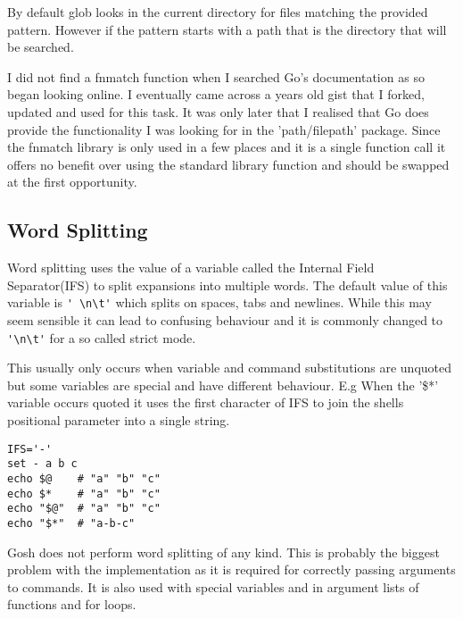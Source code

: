 By default glob looks in the current directory for files matching the provided pattern.
However if the pattern starts with a path that is the directory that will be searched.

I did not find a fnmatch function when I searched Go's documentation as so began looking online.
I eventually came across a years old gist that I forked, updated and used for this task.
It was only later that I realised that Go does provide the functionality I was looking for in the 'path/filepath' package.
Since the fnmatch library is only used in a few places and it is a single function call it offers no benefit over using the standard library function and should be swapped at the first opportunity. 

\subsection{Word Splitting}
Word splitting uses the value of a variable called the Internal Field Separator(IFS) to split expansions into multiple words.
The default value of this variable is \verb!' \n\t'! which splits on spaces, tabs and newlines.
While this may seem sensible it can lead to confusing behaviour and it is commonly changed to \verb!'\n\t'!
for a so called strict mode.

This usually only occurs when variable and command substitutions are unquoted but some variables are special and have different behaviour.
E.g When the '\$*' variable occurs quoted it uses the first character of IFS to join the shells positional parameter into a single string.
\begin{verbatim}
IFS='-'
set - a b c
echo $@    # "a" "b" "c"
echo $*    # "a" "b" "c"
echo "$@"  # "a" "b" "c"
echo "$*"  # "a-b-c"
\end{verbatim}

Gosh does not perform word splitting of any kind.
This is probably the biggest problem with the implementation as it is required for correctly passing arguments to commands.
It is also used with special variables and in argument lists of functions and for loops.




